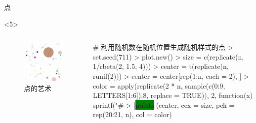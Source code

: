 \documentclass{beamerthemeMono}
\begin{document}
\begin{frame}[t,fragile]{\subsecname}{点}
\begin{overlayarea}{\textwidth}{\textheight}
\begin{onlyenv}<5>
  \begin{columns}
    \begin{column}{.4\textwidth}
\centering
\begin{figure}
    \includegraphics[width=\columnwidth]{points-art04.png}
    \caption{点的艺术}
\end{figure}
    \end{column}

    \begin{column}{.6\textwidth}
\begin{rcode}
# 利用随机数在随机位置生成随机样式的点
> set.seed(711)
> plot.new()
> size = c(replicate(n, 1/rbeta(2, 1.5, 4)))
> center = t(replicate(n, runif(2)))
> center = center[rep(1:n, each = 2), ]
> color = apply(replicate(2 * n, sample(c(0:9, LETTERS[1:6]),8, replace = TRUE)),
              2, function(x) sprintf("#%
> |\colorbox{green}{points}|(center, cex = size, pch = rep(20:21, n), col = color)
\end{rcode}
    \end{column}
  \end{columns}
\end{onlyenv}
\end{overlayarea}  
\end{frame}
\end{document}
